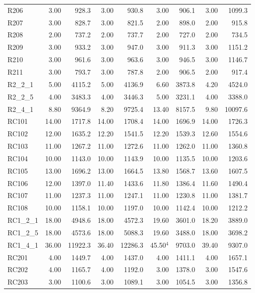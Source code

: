 \documentclass{article}
\begin{document}
{\begin{longtable}{l r r r r r r r r }
R206 & 3.00 & 928.3 & 3.00 & 930.8 & 3.00 & 906.1 & 3.00 & 1099.3 \\
R207 & 3.00 & 828.7 & 3.00 & 821.5 & 2.00 & 898.0 & 2.00 & 915.8 \\
R208 & 2.00 & 737.2 & 2.00 & 737.7 & 2.00 & 727.0 & 2.00 & 734.5 \\
R209 & 3.00 & 933.2 & 3.00 & 947.0 & 3.00 & 911.3 & 3.00 & 1151.2 \\
R210 & 3.00 & 961.6 & 3.00 & 963.6 & 3.00 & 946.5 & 3.00 & 1146.7 \\
R211 & 3.00 & 793.7 & 3.00 & 787.8 & 2.00 & 906.5 & 2.00 & 917.4 \\
R2\_2\_1 & 5.00 & 4115.2 & 5.00 & 4136.9 & 6.60 & 3873.8 & 4.20 & 4524.0 \\
R2\_2\_5 & 4.00 & 3483.3 & 4.00 & 3446.3 & 5.00 & 3231.1 & 4.00 & 3388.0 \\
R2\_4\_1 & 8.80 & 9364.9 & 8.20 & 9725.4 & 13.40 & 8157.5 & 9.80 & 10097.6 \\
RC101 & 14.00 & 1717.8 & 14.00 & 1708.4 & 14.00 & 1696.9 & 14.00 & 1726.3 \\
RC102 & 12.00 & 1635.2 & 12.20 & 1541.5 & 12.20 & 1539.3 & 12.60 & 1554.6 \\
RC103 & 11.00 & 1267.2 & 11.00 & 1272.6 & 11.00 & 1262.0 & 11.00 & 1360.8 \\
RC104 & 10.00 & 1143.0 & 10.00 & 1143.9 & 10.00 & 1135.5 & 10.00 & 1203.6 \\
RC105 & 13.00 & 1696.2 & 13.00 & 1664.5 & 13.80 & 1568.7 & 13.60 & 1607.5 \\
RC106 & 12.00 & 1397.0 & 11.40 & 1433.6 & 11.80 & 1386.4 & 11.60 & 1490.4 \\
RC107 & 11.00 & 1237.3 & 11.00 & 1247.1 & 11.00 & 1230.8 & 11.00 & 1381.7 \\
RC108 & 10.00 & 1158.1 & 10.00 & 1197.0 & 10.00 & 1142.4 & 10.00 & 1212.2 \\
RC1\_2\_1 & 18.00 & 4948.6 & 18.00 & 4572.3 & 19.60 & 3601.0 & 18.20 & 3889.0 \\
RC1\_2\_5 & 18.00 & 4573.6 & 18.00 & 5088.3 & 19.60 & 3488.0 & 18.00 & 3698.2 \\
RC1\_4\_1 & 36.00 & 11922.3 & 36.40 & 12286.3 & 45.50$^{4}$ & 9703.0 & 39.40 & 9307.0 \\
RC201 & 4.00 & 1449.7 & 4.00 & 1437.0 & 4.00 & 1411.1 & 4.00 & 1657.1 \\
RC202 & 4.00 & 1165.7 & 4.00 & 1192.0 & 3.00 & 1378.0 & 3.00 & 1547.6 \\
RC203 & 3.00 & 1100.6 & 3.00 & 1089.1 & 3.00 & 1054.5 & 3.00 & 1356.8 \\

\end{longtable}}
\end{document}
